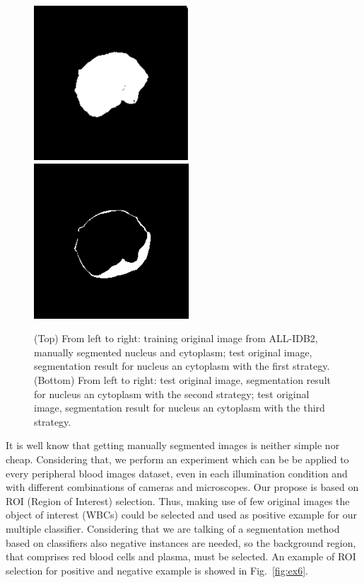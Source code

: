 \documentclass[final,a4paper,12pt,english]{UnicaPhdThesis3}
\begin{document}
\begin{figure}[!b]
		\includegraphics[height=0.10\textheight]{images/2015_1_caip/4-2}
		\includegraphics[height=0.10\textheight]{images/2015_1_caip/4-3}
		\caption{\label{fig:exs} (Top) From left to right: training original image from ALL-IDB2, manually segmented nucleus and cytoplasm; test original image, segmentation result for nucleus an cytoplasm with the first strategy. (Bottom) From left to right: test original image, segmentation result for nucleus an cytoplasm with the second strategy; test original image, segmentation result for nucleus an cytoplasm with the third strategy.}
	\end{figure}
	
	It is well know that getting manually segmented images is neither simple nor cheap. Considering that, we perform an experiment which can be be applied to every peripheral blood images dataset, even in each illumination condition and with different combinations  of cameras and microscopes. 
	Our propose is based on ROI (Region of Interest) selection. Thus, making use of few original images the object of interest (WBCs) could be selected and used as positive example for our multiple classifier. Considering that we are talking of a segmentation method based on classifiers also negative instances are needed, so the background region, that comprises red blood cells and plasma, must be selected. An example of ROI selection for positive and negative example is showed in Fig.~\ref{fig:ex6}.
	
\end{document}
